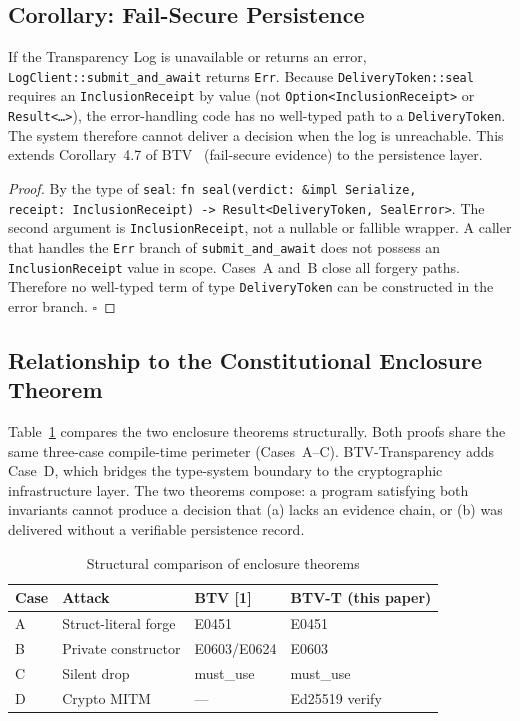 \subsection{Corollary: Fail-Secure Persistence}

\begin{corollary}
\label{cor:fail-secure}
If the Transparency Log is unavailable or returns an error,
\texttt{LogClient::submit\_and\_await} returns \texttt{Err}.
Because \texttt{DeliveryToken::seal} requires an
\texttt{InclusionReceipt} by value (not \texttt{Option<InclusionReceipt>}
or \texttt{Result<\ldots>}), the error-handling code has no
well-typed path to a \texttt{DeliveryToken}. The system therefore
cannot deliver a decision when the log is unreachable.
This extends Corollary~4.7 of BTV~\cite{btv2026} (fail-secure
evidence) to the persistence layer.
\end{corollary}

\begin{proof}
By the type of \texttt{seal}: \texttt{fn~seal(verdict:~\&impl~Serialize,
receipt:~InclusionReceipt)~->~Result<DeliveryToken,~SealError>}.
The second argument is \texttt{InclusionReceipt}, not a nullable or
fallible wrapper. A caller that handles the \texttt{Err} branch of
\texttt{submit\_and\_await} does not possess an
\texttt{InclusionReceipt} value in scope. Cases~A and~B close all
forgery paths. Therefore no well-typed term of type
\texttt{DeliveryToken} can be constructed in the error branch.
$\square$
\end{proof}

\subsection{Relationship to the Constitutional Enclosure Theorem}

Table~\ref{tab:comparison} compares the two enclosure theorems
structurally. Both proofs share the same three-case compile-time
perimeter (Cases~A--C). BTV-Transparency adds Case~D, which bridges
the type-system boundary to the cryptographic infrastructure layer.
The two theorems compose: a program satisfying both invariants
cannot produce a decision that (a) lacks an evidence chain, or
(b) was delivered without a verifiable persistence record.

\begin{table}[h]
\caption{Structural comparison of enclosure theorems}
\label{tab:comparison}
\centering
\begin{tabular}{llll}
\hline
\textbf{Case} & \textbf{Attack} & \textbf{BTV [1]} & \textbf{BTV-T (this paper)} \\
\hline
A & Struct-literal forge & E0451 & E0451 \\
B & Private constructor & E0603/E0624 & E0603 \\
C & Silent drop & must\_use & must\_use \\
D & Crypto MITM & --- & Ed25519 verify \\
\hline
\end{tabular}
\end{table}
